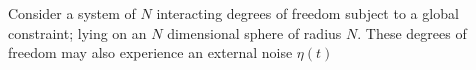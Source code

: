 Consider a system of $N$ interacting degrees of freedom subject to a global constraint; lying on an $N$ dimensional sphere of radius $N$. These degrees of freedom may also experience an external noise $\eta(t)$